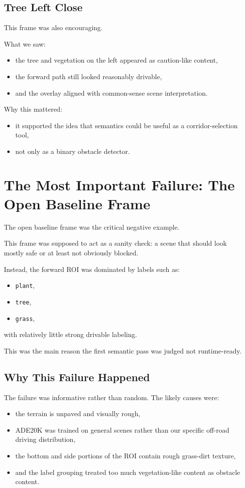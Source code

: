 \documentclass[11pt]{article}
\begin{document}
\subsection{Tree Left Close}
This frame was also encouraging.

What we saw:
\begin{itemize}[leftmargin=*]
\item the tree and vegetation on the left appeared as caution-like content,
\item the forward path still looked reasonably drivable,
\item and the overlay aligned with common-sense scene interpretation.
\end{itemize}

Why this mattered:
\begin{itemize}[leftmargin=*]
\item it supported the idea that semantics could be useful as a corridor-selection tool,
\item not only as a binary obstacle detector.
\end{itemize}

\section{The Most Important Failure: The Open Baseline Frame}
The open baseline frame was the critical negative example.

This frame was supposed to act as a sanity check: a scene that should look mostly safe or at least not obviously blocked.

Instead, the forward ROI was dominated by labels such as:
\begin{itemize}[leftmargin=*]
\item \texttt{plant},
\item \texttt{tree},
\item \texttt{grass},
\end{itemize}
with relatively little strong drivable labeling.

This was the main reason the first semantic pass was judged not runtime-ready.

\subsection{Why This Failure Happened}
The failure was informative rather than random. The likely causes were:
\begin{itemize}[leftmargin=*]
\item the terrain is unpaved and visually rough,
\item ADE20K was trained on general scenes rather than our specific off-road driving distribution,
\item the bottom and side portions of the ROI contain rough grass-dirt texture,
\item and the label grouping treated too much vegetation-like content as obstacle content.
\end{itemize}
\end{document}
